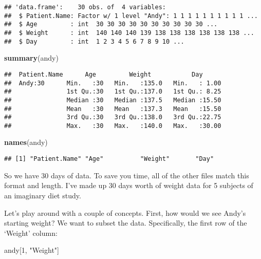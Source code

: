 \documentclass[
]{article}
\newenvironment{Shaded}{\begin{snugshade}}{\end{snugshade}}
\newcommand{\DecValTok}[1]{\textcolor[rgb]{0.00,0.00,0.81}{#1}}
\newcommand{\KeywordTok}[1]{\textcolor[rgb]{0.13,0.29,0.53}{\textbf{#1}}}
\newcommand{\NormalTok}[1]{#1}
\newcommand{\StringTok}[1]{\textcolor[rgb]{0.31,0.60,0.02}{#1}}
\begin{document}
\begin{verbatim}
## 'data.frame':    30 obs. of  4 variables:
##  $ Patient.Name: Factor w/ 1 level "Andy": 1 1 1 1 1 1 1 1 1 1 ...
##  $ Age         : int  30 30 30 30 30 30 30 30 30 30 ...
##  $ Weight      : int  140 140 140 139 138 138 138 138 138 138 ...
##  $ Day         : int  1 2 3 4 5 6 7 8 9 10 ...
\end{verbatim}

\begin{Shaded}
\begin{Highlighting}[]
\KeywordTok{summary}\NormalTok{(andy)}
\end{Highlighting}
\end{Shaded}

\begin{verbatim}
##  Patient.Name      Age         Weight           Day       
##  Andy:30      Min.   :30   Min.   :135.0   Min.   : 1.00  
##               1st Qu.:30   1st Qu.:137.0   1st Qu.: 8.25  
##               Median :30   Median :137.5   Median :15.50  
##               Mean   :30   Mean   :137.3   Mean   :15.50  
##               3rd Qu.:30   3rd Qu.:138.0   3rd Qu.:22.75  
##               Max.   :30   Max.   :140.0   Max.   :30.00
\end{verbatim}

\begin{Shaded}
\begin{Highlighting}[]
\KeywordTok{names}\NormalTok{(andy)}
\end{Highlighting}
\end{Shaded}

\begin{verbatim}
## [1] "Patient.Name" "Age"          "Weight"       "Day"
\end{verbatim}

So we have 30 days of data. To save you time, all of the other files
match this format and length. I've made up 30 days worth of weight data
for 5 subjects of an imaginary diet study.

Let's play around with a couple of concepts. First, how would we see
Andy's starting weight? We want to subset the data. Specifically, the
first row of the `Weight' column:

\begin{Shaded}
\begin{Highlighting}[]
\NormalTok{andy[}\DecValTok{1}\NormalTok{, }\StringTok{"Weight"}\NormalTok{]}
\end{Highlighting}
\end{Shaded}
\end{document}
